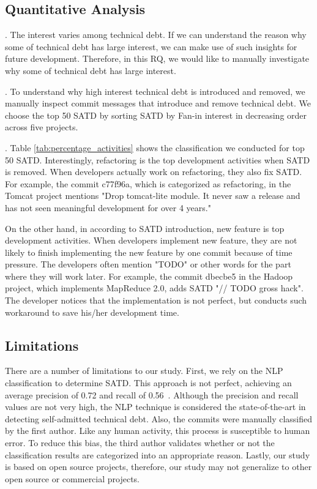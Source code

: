 \documentclass[10pt, conference]{IEEEtran}
\newcommand{\smallsection}[1]{\vspace{1mm}\noindent {\bf #1}.\hspace{2mm}}
\begin{document}
\subsection{Quantitative Analysis}
\smallsection{Motivation}
The interest varies among technical debt. If we can understand the reason why some of technical debt has large interest, we can make use of such insights for future development. Therefore, in this RQ, we would like to manually investigate why some of technical debt has large interest.

\smallsection{Approach}
To understand why high interest technical debt is introduced and removed, we manually inspect commit messages that introduce and remove technical debt. We choose the top 50 SATD by sorting SATD by Fan-in interest in decreasing order across five projects.


\smallsection{Results}
Table \ref{tab:percentage_activities} shows the classification we conducted for top 50 SATD. Interestingly, refactoring is the top development activities when SATD is removed. When developers actually work on refactoring, they also fix SATD. For example, the commit c77f96a, which is categorized as refactoring, in the Tomcat project mentions "Drop tomcat-lite module. It never saw a release and has not seen meaningful development for over 4 years."

On the other hand, in according to SATD introduction, new feature is top development activities. When developers implement new feature, they are not likely to finish implementing the new feature by one commit because of time pressure. The developers often mention "TODO" or other words for the part where they will work later. For example, the commit dbecbe5 in the Hadoop project, which implements MapReduce 2.0, adds SATD "// TODO gross hack". The developer notices that the implementation is not perfect, but conducts such workaround to save his/her development time.

\subsection{Limitations} \label{limitations}
There are a number of limitations to our study. First, we rely on the NLP classification to determine SATD. This approach is not perfect, achieving an average precision of 0.72 and recall of 0.56~\cite{Maldonado_TSE2017}. Although the precision and recall values are not very high, the NLP technique is considered the state-of-the-art in detecting self-admitted technical debt. Also, the commits were manually classified by the first author. Like any human activity, this process is susceptible to human error. To reduce this bias, the third author validates whether or not the classification results are categorized into an appropriate reason. Lastly, our study is based on open source projects, therefore, our study may not generalize to other open source or commercial projects.
\end{document}
